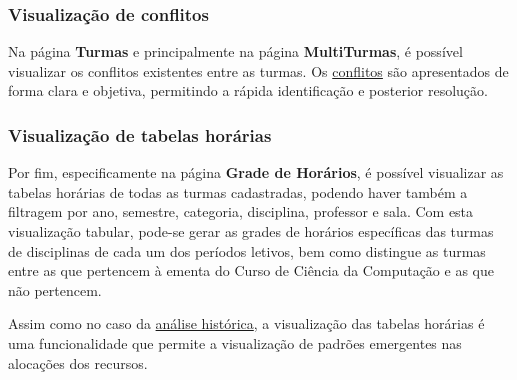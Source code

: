 \subsubsection*{Visualização de conflitos} \label{sssec:Visualização de conflitos}

Na página \textbf{Turmas} e principalmente na página \textbf{MultiTurmas}, é possível visualizar os conflitos existentes entre as turmas. Os \hyperref[sec:conflitos]{conflitos} são apresentados de forma clara e objetiva, permitindo a rápida identificação e posterior resolução.

\subsubsection*{Visualização de tabelas horárias} \label{sssec:Visualização de tabelas horárias}

Por fim, especificamente na página \textbf{Grade de Horários}, é possível visualizar as tabelas horárias de todas as turmas cadastradas, podendo haver também a filtragem por ano, semestre, categoria, disciplina, professor e sala. Com esta visualização tabular, pode-se gerar as grades de horários específicas das turmas de disciplinas de cada um dos períodos letivos, bem como distingue as turmas entre as que pertencem à ementa do Curso de Ciência da Computação e as que não pertencem.

Assim como no caso da \hyperref[sssec:Análise histórica]{análise histórica}, a visualização das tabelas horárias é uma funcionalidade que permite a visualização de padrões emergentes nas alocações dos recursos.